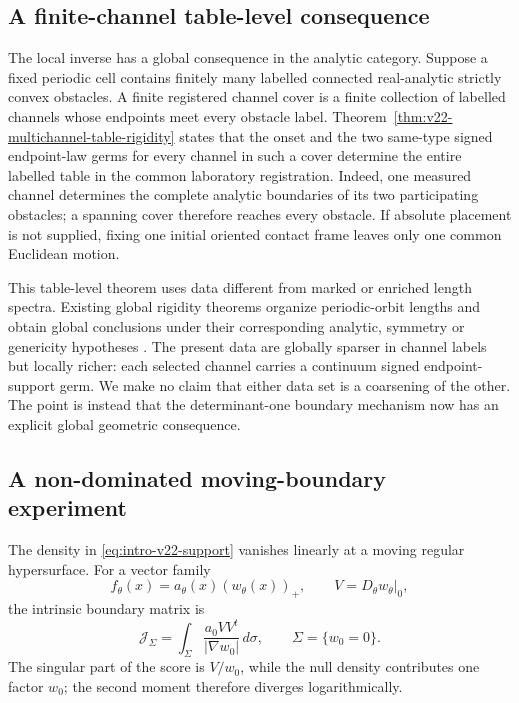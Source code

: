 \subsection{A finite-channel table-level consequence}

The local inverse has a global consequence in the analytic category.  Suppose
a fixed periodic cell contains finitely many labelled connected real-analytic
strictly convex obstacles.  A finite registered channel cover is a finite
collection of labelled channels whose endpoints meet every obstacle label.
Theorem~\ref{thm:v22-multichannel-table-rigidity} states that the onset and
the two same-type signed endpoint-law germs for every channel in such a cover
determine the entire labelled table in the common laboratory registration.
Indeed, one measured channel determines the complete analytic boundaries of
its two participating obstacles; a spanning cover therefore reaches every
obstacle.  If absolute placement is not supplied, fixing one initial oriented
contact frame leaves only one common Euclidean motion.

This table-level theorem uses data different from marked or enriched length
spectra.  Existing global rigidity theorems organize periodic-orbit lengths
and obtain global conclusions under their corresponding analytic,
symmetry or genericity hypotheses
\cite{BDKL,DSKL,Osterman,FinamoreLeguil}.  The present data are globally
sparser in channel labels but locally richer: each selected channel carries a
continuum signed endpoint-support germ.  We make no claim that either data set
is a coarsening of the other.  The point is instead that the determinant-one
boundary mechanism now has an explicit global geometric consequence.

\subsection{A non-dominated moving-boundary experiment}

The density in \eqref{eq:intro-v22-support} vanishes linearly at a moving
regular hypersurface.  For a vector family
\[
 f_\theta(x)=a_\theta(x)(w_\theta(x))_+,
 \qquad
 V=D_\theta w_\theta|_0,
\]
the intrinsic boundary matrix is
\begin{equation}\label{eq:intro-v22-information}
 \mathcal J_\Sigma=
 \int_\Sigma\frac{a_0VV^t}{|\nabla w_0|}\,d\sigma,
 \qquad \Sigma=\{w_0=0\}.
\end{equation}
The singular part of the score is $V/w_0$, while the null density contributes
one factor $w_0$; the second moment therefore diverges logarithmically.

